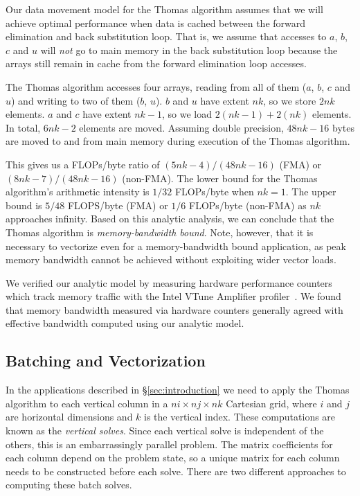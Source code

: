 \documentclass{sig-alternate-05-2015}
\begin{document}
Our data movement model for the Thomas algorithm assumes that we will achieve
  optimal performance when data is cached between the forward elimination and
  back substitution loop.
That is, we assume that accesses to \(a\), \(b\), \(c\) and \(u\) will
  \emph{not} go to main memory in the back substitution loop because the arrays
  still remain in cache from the forward elimination loop accesses.

The Thomas algorithm accesses four arrays, reading from all of them (\(a\),
  \(b\), \(c\) and \(u\)) and writing to two of them (\(b\), \(u\)).
\(b\) and \(u\) have extent \(nk\), so we store \(2nk\) elements.
\(a\) and \(c\) have extent \(nk-1\), so we load \(2(nk-1)+2(nk)\) elements.
In total, \(6nk-2\) elements are moved.
Assuming double precision, \(48nk-16\) bytes are moved to and from main memory
  during execution of the Thomas algorithm.

This gives us a FLOPs/byte ratio of \((5nk-4)/(48nk-16)\) (FMA) or
  \((8nk-7)/(48nk-16)\) (non-FMA).
The lower bound for the Thomas algorithm's arithmetic intensity is \(1/32\)
  FLOPs/byte when \(nk=1\). 
The upper bound is \(5/48\) FLOPS/byte (FMA) or \(1/6\) FLOPs/byte (non-FMA) as
  \(nk\) approaches infinity.
Based on this analytic analysis, we can conclude that the Thomas algorithm is
  \emph{memory-bandwidth bound}.
Note, however, that it is necessary to vectorize even for a memory-bandwidth bound
  application, as peak memory bandwidth cannot be achieved without exploiting
  wider vector loads.

We verified our analytic model by measuring hardware performance counters which
  track memory traffic with the Intel VTune Amplifier
  profiler~\cite{intel_vtune_amplifier}.
We found that memory bandwidth measured via hardware counters generally agreed
  with effective bandwidth computed using our analytic model.

\subsection{Batching and Vectorization}
\label{sec:implementation:batching_and_parallelism}

In the applications described in \S\ref{sec:introduction} we need to apply the
  Thomas algorithm to each vertical column in a \(ni \times nj \times nk\)
  Cartesian grid, where \(i\) and \(j\) are horizontal dimensions and \(k\) is
  the vertical index.
These computations are known as the \emph{vertical solves}.
Since each vertical solve is independent of the others, this is an
  embarrassingly parallel problem.
The matrix coefficients for each column depend on the problem state, so a
  unique matrix for each column needs to be constructed before each solve.
There are two different approaches to computing these batch solves.
\end{document}
